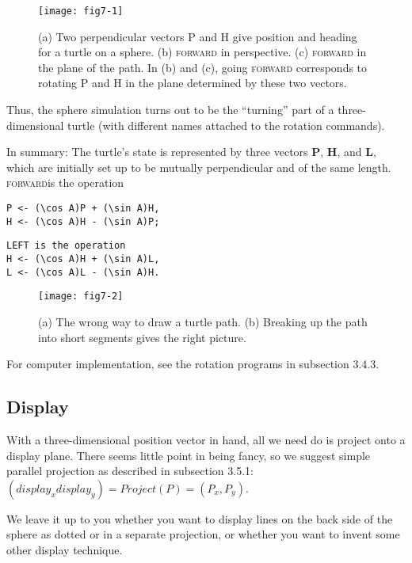 \documentclass{book}
\begin{document}
\begin{figure}
\begin{center}
\texttt{[image: fig7-1]}
\caption{(a) Two perpendicular vectors P and H give position and heading for a turtle on a sphere. (b) \textsc{forward} in perspective. (c) \textsc{forward} in the plane of the path. In (b) and (c), going \textsc{forward} corresponds to rotating P and H in the plane determined by these
two vectors.}
\end{center}
\end{figure}

Thus, the sphere simulation turns out to be the ``turning'' part of a
three-dimensional turtle (with different names attached to the rotation
commands).

In summary: The turtle's state is represented by three vectors \textbf{P}, \textbf{H},
and \textbf{L}, which are initially set up to be mutually perpendicular and of
the same length. \textsc{forward}is the operation

\begin{verbatim}
P <- (\cos A)P + (\sin A)H,
H <- (\cos A)H - (\sin A)P;
\end{verbatim}
\begin{verbatim}
LEFT is the operation
H <- (\cos A)H + (\sin A)L,
L <- (\cos A)L - (\sin A)H.
\end{verbatim}
\begin{figure}
\begin{center}
\texttt{[image: fig7-2]}
\caption{(a) The wrong way to draw a turtle path. (b) Breaking up the path into short segments gives the right picture.}
\end{center}
\end{figure}

For computer implementation, see the rotation programs in subsection 3.4.3.

\subsection{Display}

With a three-dimensional position vector in hand, all we need do is
project onto a display plane. There seems little point in being fancy, so
we suggest simple parallel projection as described in subsection 3.5.1:
$(display_x display_y) = Project(P) = (P_x, P_y)$.

We leave it up to you whether you want to display lines on the back side
of the sphere as dotted or in a separate projection, or whether you want
to invent some other display technique.
\end{document}
